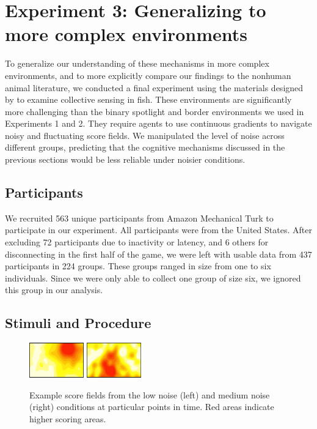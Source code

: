 \documentclass[12pt,letterpaper]{article}
\begin{document}
\section{Experiment 3: Generalizing to more complex environments}

To generalize our understanding of these mechanisms in more complex environments, and to more explicitly compare our findings to the nonhuman animal literature, we conducted a final experiment using the materials designed by  to examine collective sensing in fish.
These environments are significantly more challenging than the binary spotlight and border environments we used in Experiments 1 and 2.
They require agents to use continuous gradients to navigate noisy and fluctuating score fields.
We manipulated the level of noise across different groups, predicting that the cognitive mechanisms discussed in the previous sections would be less reliable under noisier conditions.

\subsection{Participants}
We recruited 563 unique participants from Amazon Mechanical Turk to
participate in our experiment.  All participants were from the United
States.  After excluding 72 participants due to inactivity or latency,
and 6 others for disconnecting in the first half of the game, we were
left with usable data from 437 participants in 224 groups.  These
groups ranged in size from one to six individuals.  Since we were only
able to collect one group of size six, we ignored this group in our
analysis.

\subsection{Stimuli and Procedure}

\begin{figure}
  \centering
  \includegraphics[width=0.21\textwidth]{./figures/easy-field}
  \hspace{0.1cm}
  \includegraphics[width=0.21\textwidth]{./figures/medium-field}
  \caption{Example score fields from the low noise (left) and medium
    noise (right) conditions at particular points in time.  Red areas
    indicate higher scoring areas.}
  \label{fig:score}
\end{figure}
\end{document}
